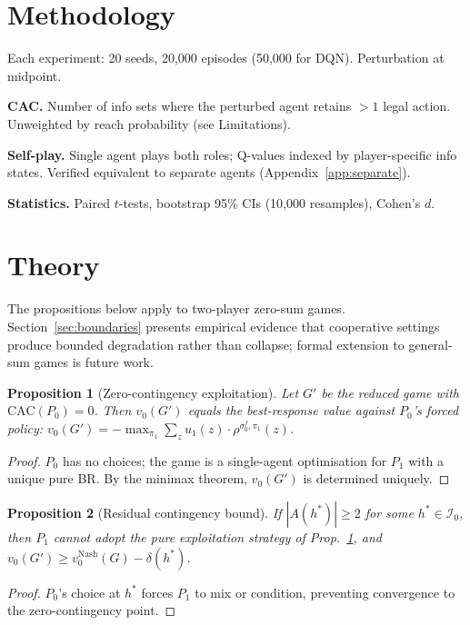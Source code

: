 \documentclass[sigconf,anonymous]{acmart}
\newtheorem{proposition}{Proposition}
\begin{document}
\section{Methodology}

Each experiment: 20 seeds, 20{,}000 episodes (50{,}000 for DQN). Perturbation at midpoint.

\textbf{CAC.} Number of info sets where the perturbed agent retains $>1$ legal action. Unweighted by reach probability (see Limitations).

\textbf{Self-play.} Single agent plays both roles; Q-values indexed by player-specific info states. Verified equivalent to separate agents (Appendix~\ref{app:separate}).

\textbf{Statistics.} Paired $t$-tests, bootstrap 95\% CIs (10{,}000 resamples), Cohen's $d$.

\section{Theory}

The propositions below apply to two-player zero-sum games. Section~\ref{sec:boundaries} presents empirical evidence that cooperative settings produce bounded degradation rather than collapse; formal extension to general-sum games is future work.

\begin{proposition}[Zero-contingency exploitation]
\label{prop:zero}
Let $G'$ be the reduced game with $\mathrm{CAC}(P_0)=0$. Then $v_0(G')$ equals the best-response value against $P_0$'s forced policy: $v_0(G') = -\max_{\pi_1} \sum_z u_1(z) \cdot \rho^{\sigma_0^f,\pi_1}(z)$.
\end{proposition}
\begin{proof}
$P_0$ has no choices; the game is a single-agent optimisation for $P_1$ with a unique pure BR. By the minimax theorem, $v_0(G')$ is determined uniquely.
\end{proof}

\begin{proposition}[Residual contingency bound]
\label{prop:residual}
If $|A(h^*)| \geq 2$ for some $h^* \in \mathcal{I}_0$, then $P_1$ cannot adopt the pure exploitation strategy of Prop.~\ref{prop:zero}, and $v_0(G') \geq v_0^{\mathrm{Nash}}(G) - \delta(h^*)$.
\end{proposition}
\begin{proof}
$P_0$'s choice at $h^*$ forces $P_1$ to mix or condition, preventing convergence to the zero-contingency point.
\end{proof}
\end{document}
